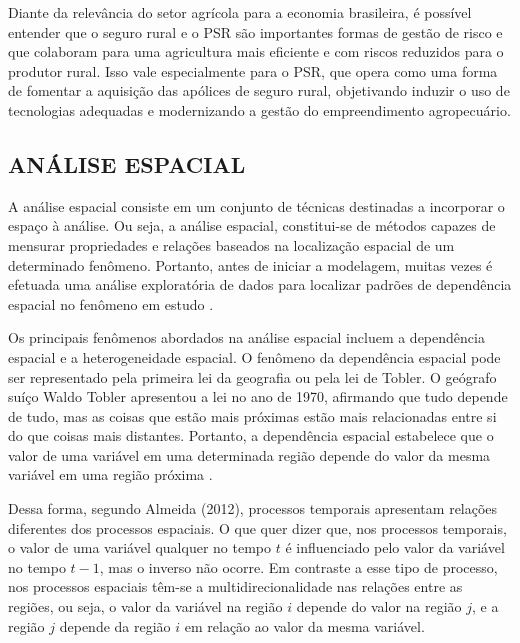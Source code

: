 \documentclass[
	12pt,				%
	openright,			%
	oneside,			%
	a4paper,			%
	chapter=TITLE,		%
	section=TITLE,		%
	english,			%
	french,				%
	spanish,			%
	brazil				%
	]{abntex2}
\begin{document}
Diante da relevância do setor agrícola para a economia brasileira, é possível entender que o seguro rural e o PSR são importantes formas de gestão de risco e que colaboram para uma agricultura mais eficiente e com riscos reduzidos para o produtor rural. Isso vale especialmente para o PSR, que opera como uma forma de fomentar a aquisição das apólices de seguro rural, objetivando induzir o uso de tecnologias adequadas e modernizando a gestão do empreendimento agropecuário. 




\subsection{ANÁLISE ESPACIAL}

A análise espacial consiste em um conjunto de técnicas destinadas a incorporar o espaço à análise. Ou seja, a análise espacial, constitui-se de métodos capazes de mensurar propriedades e relações baseados na localização espacial de um determinado fenômeno. Portanto, antes de iniciar a modelagem, muitas vezes é efetuada uma análise exploratória de dados para localizar padrões de dependência espacial no fenômeno em estudo \cite{camara04}.

Os principais fenômenos abordados na análise espacial incluem a dependência espacial e a heterogeneidade espacial. O fenômeno da dependência espacial pode ser representado pela primeira lei da geografia ou pela lei de Tobler. O geógrafo suíço Waldo Tobler apresentou a lei no ano de 1970, afirmando que tudo depende de tudo, mas as coisas que estão mais próximas estão mais relacionadas entre si do que coisas mais distantes. Portanto, a dependência espacial estabelece que o valor de uma variável em uma determinada região depende do valor da mesma variável em uma região próxima \cite{almeida12}.

Dessa forma, segundo Almeida (2012), processos temporais apresentam relações diferentes dos processos espaciais. O que quer dizer que, nos processos temporais, o valor de uma variável qualquer no tempo $t$ é influenciado pelo valor da variável no tempo $t-1$, mas o inverso não ocorre. Em contraste a esse tipo de processo, nos  processos espaciais têm-se a multidirecionalidade nas relações entre as regiões, ou seja, o valor da variável na região $i$ depende do valor na região $j$, e a região $j$ depende da região $i$ em relação ao valor da mesma variável.
\end{document}
